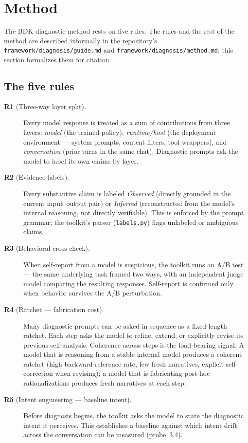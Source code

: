 \section{Method}
\label{sec:method}

The BDK diagnostic method rests on five rules. The rules and the rest
of the method are described informally in the repository's
\texttt{framework/diagnosis/guide.md} and \texttt{framework/diagnosis/method.md}; this section formalizes them
for citation.

\subsection{The five rules}
\label{sec:rules}

\begin{description}
    \item[\textbf{R1} (Three-way layer split).] Every model response
        is treated as a sum of contributions from three layers:
        \emph{model} (the trained policy), \emph{runtime/host} (the
        deployment environment --- system prompts, content filters,
        tool wrappers), and \emph{conversation} (prior turns in the
        same chat). Diagnostic prompts ask the model to label its own
        claims by layer.

    \item[\textbf{R2} (Evidence labels).] Every substantive claim is
        labeled \emph{Observed} (directly grounded in the current
        input--output pair) or \emph{Inferred} (reconstructed from the
        model's internal reasoning, not directly verifiable). This is
        enforced by the prompt grammar; the toolkit's parser
        (\texttt{labels.py}) flags unlabeled or ambiguous claims.

    \item[\textbf{R3} (Behavioral cross-check).] When self-report from
        a model is suspicious, the toolkit runs an A/B test --- the
        same underlying task framed two ways, with an independent
        judge model comparing the resulting responses. Self-report is
        confirmed only when behavior survives the A/B perturbation.

    \item[\textbf{R4} (Ratchet --- fabrication cost).] Many diagnostic
        prompts can be asked in sequence as a fixed-length ratchet.
        Each step asks the model to refine, extend, or explicitly
        revise its previous self-analysis. Coherence across steps is
        the load-bearing signal. A model that is reasoning from a
        stable internal model produces a coherent ratchet (high
        backward-reference rate, few fresh narratives, explicit
        self-correction when revising); a model that is fabricating
        post-hoc rationalizations produces fresh narratives at each
        step.

    \item[\textbf{R5} (Intent engineering --- baseline intent).]
        Before diagnosis begins, the toolkit asks the model to state
        the diagnostic intent it perceives. This establishes a
        baseline against which intent drift across the conversation
        can be measured (probe~3.4).
\end{description}


